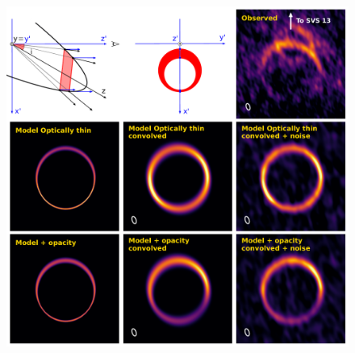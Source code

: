 \documentclass[12pt]{mythesis}
\begin{document}
\begin{figure}[p!]
{\centering
 \includegraphics[width=1\textwidth]{figures/extdat_fig8.pdf}\\
}
\end{figure}
\end{document}
